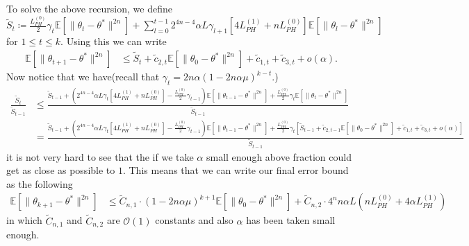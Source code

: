 \documentclass[a4paper]{article}
\newcommand{\norm}[1]{\|#1 \|}
\newcommand{\Exs}{\mathbb{E}}
\newcommand{\thetastar}{\theta^*}
\newcommand{\constLPH}[1]{L_{PH}^{(#1)}}
\newcommand{\stepsize}{\alpha}
\begin{document}
	To solve the above recursion, we define $\tilde{S}_{t} \coloneq \frac{\constLPH{0}}{2}\gamma_{t}\Exs\left[\norm{\theta_{t} - \thetastar}^{2n}\right] + \sum_{l = 0}^{t - 1}2^{4n - 4}\stepsize L \gamma_{l + 1}\left[4\constLPH{1} + n\constLPH{0}\right]\Exs\left[\norm{\theta_{l} - \thetastar}^{2n}\right]$ for $1 \leq t \leq k$. Using this we can write
	\begin{align*}
		\Exs\left[\norm{\theta_{t + 1} - \thetastar}^{2n}\right] & \leq \tilde{S}_{t} + \tilde{c}_{2, t}\Exs\left[\norm{\theta_{0} - \thetastar}^{2n}\right] + \tilde{c}_{1, t} + \tilde{c}_{3, t} + o\left(\stepsize\right).
	\end{align*}
	Now notice that we have(recall that $\gamma_{t} = 2n\stepsize\left(1 - 2n\stepsize\mu\right)^{k - t}$.)
	\begin{align*}
		\frac{\tilde{S}_{t}}{\tilde{S}_{t - 1}} &‌ \leq \frac{\tilde{S}_{t - 1} + \left(2^{4n - 4}\stepsize L \gamma_{t}\left[4\constLPH{1} + n\constLPH{0}\right] - \frac{\constLPH{0}}{2}\gamma_{t - 1}\right)\Exs\left[\norm{\theta_{t - 1} - \thetastar}^{2n}\right] + \frac{\constLPH{0}}{2}\gamma_{t}\Exs\left[\norm{\theta_{t} - \thetastar}^{2n}\right]}{\tilde{S}_{t - 1}}\\
		& = \frac{\tilde{S}_{t - 1} + \left(2^{4n - 4}\stepsize L \gamma_{t}\left[4\constLPH{1} + n\constLPH{0}\right] - \frac{\constLPH{0}}{2}\gamma_{t - 1}\right)\Exs\left[\norm{\theta_{t - 1} - \thetastar}^{2n}\right] + \frac{\constLPH{0}}{2}\gamma_{t}\left[\tilde{S}_{t - 1} + \tilde{c}_{2, t - 1}\Exs\left[\norm{\theta_{0} - \thetastar}^{2n}\right] + \tilde{c}_{1, t} + \tilde{c}_{3, t} + o\left(\stepsize\right)\right]}{\tilde{S}_{t - 1}}
	\end{align*}
	it is not very hard to see that the if we take $\stepsize$ small enough above fraction could get as close as possible to $1$. This means that we can write our final error bound as the following
	\begin{align*}
		\Exs\left[\norm{\theta_{k +‌ 1} - \thetastar}^{2n}\right] & \leq \tilde{C}_{n, 1} \cdot \left(1 - 2n\stepsize\mu\right)^{k + 1}\Exs\left[\norm{\theta_{0} - \thetastar}^{2n}\right] + \tilde{C}_{n, 2} \cdot 4^{n}n\stepsize L\left(n\constLPH{0} + 4\stepsize \constLPH{1}\right)
	\end{align*}
	in which $\tilde{C}_{n, 1}$ and $\tilde{C}_{n, 2}$ are $\mathcal{O}(1)$ constants and also $\stepsize$ has been taken small enough.
	
\end{document}
